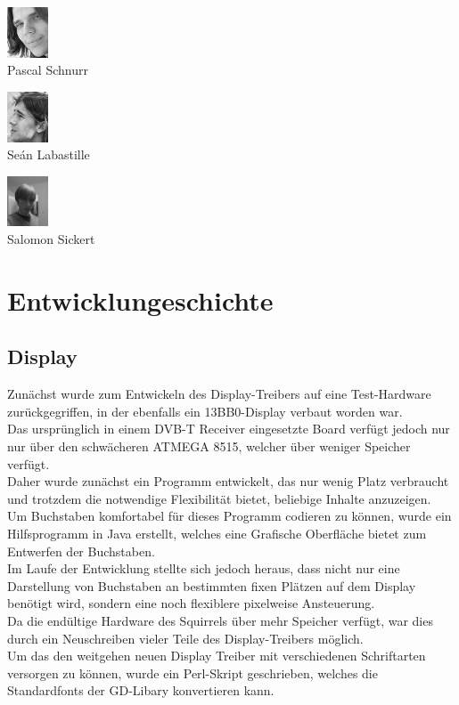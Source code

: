 \documentclass[12pt,a4paper]{article}
\begin{document}
\begin{multicols}{2}
{\begin{list}{ }
	\item    \includegraphics[height=1.5cm]{./face_Schnurrrr.png}  \\      Pascal Schnurr    
	\item    \includegraphics[height=1.5cm]{./face_Schon.png}      \\      Seán Labastille   
	\item    \includegraphics[height=1.5cm]{./face_Sickert.png}    \\      Salomon Sickert
\end{list}
}
\end{multicols}


\section{Entwicklungeschichte}
\subsection{Display}
Zunächst wurde zum Entwickeln des Display-Treibers auf eine Test-Hardware zurückgegriffen, in der ebenfalls ein 13BB0-Display verbaut worden war.\\
Das ursprünglich in einem DVB-T Receiver eingesetzte Board verfügt jedoch nur nur über den schwächeren ATMEGA 8515, welcher über weniger Speicher verfügt.\\
Daher wurde zunächst ein Programm entwickelt, das nur wenig Platz verbraucht und trotzdem die notwendige Flexibilität bietet, beliebige Inhalte anzuzeigen.\\
Um Buchstaben komfortabel für dieses Programm codieren zu können, wurde ein Hilfsprogramm in Java erstellt, welches eine Grafische Oberfläche bietet zum Entwerfen der Buchstaben.\\
Im Laufe der Entwicklung stellte sich jedoch heraus, dass nicht nur eine Darstellung von Buchstaben an bestimmten fixen Plätzen auf dem Display benötigt wird, sondern eine noch flexiblere pixelweise Ansteuerung.\\
Da die endültige Hardware des Squirrels über mehr Speicher verfügt, war dies durch ein Neuschreiben vieler Teile des Display-Treibers möglich.\\
 Um das den weitgehen neuen Display Treiber mit verschiedenen Schriftarten versorgen zu können, wurde ein Perl-Skript geschrieben, welches die Standardfonts der GD-Libary konvertieren kann.\\
\end{document}
